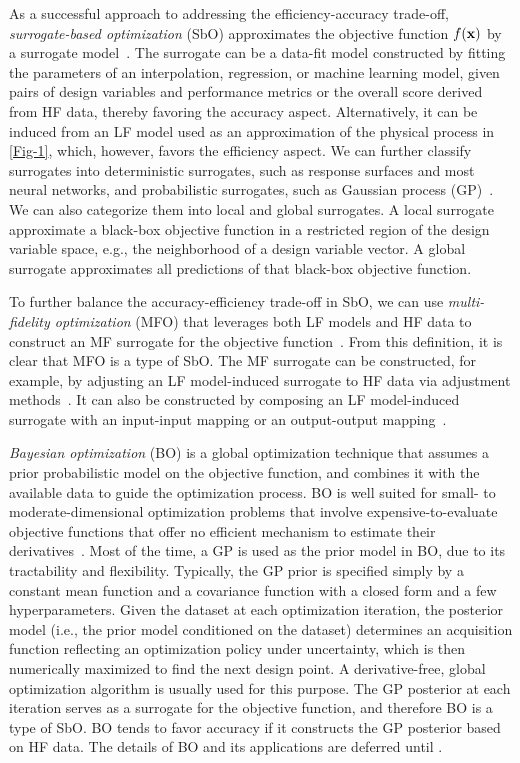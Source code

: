 \documentclass[journal ]{new-aiaa}
\begin{document}
	As a successful approach to addressing the efficiency-accuracy trade-off, \textit{surrogate-based optimization} (SbO) approximates the objective function $f(\bf x)$ by a surrogate model~\citep{Queipo2005,Wang2006,Forrester2008,Simpson2008,Forrester2009}.
	The surrogate can be a data-fit model constructed by fitting the parameters of an interpolation, regression, or machine learning model, given pairs of design variables and performance metrics or the overall score derived from HF data, thereby favoring the accuracy aspect.
	Alternatively, it can be induced from an LF model used as an approximation of the physical process in \cref{Fig-1}, which, however, favors the efficiency aspect.
	We can further classify surrogates into deterministic surrogates, such as response surfaces and most neural networks, and probabilistic surrogates, such as Gaussian process (GP)~\citep{Rasmussen2006}.
	We can also categorize them into local and global surrogates.
	A local surrogate approximate a black-box objective function in a restricted region of the design variable space, e.g., the neighborhood of a design variable vector.
	A global surrogate approximates all predictions of that black-box objective function.
	
	To further balance the accuracy-efficiency trade-off in SbO, we can use \textit{multi-fidelity optimization} (MFO) that leverages both LF models and HF data to construct an MF surrogate for the objective function~\citep{Alexandrov1998,Huang2006smo,Forrester2007,Viana2014}.
	From this definition, it is clear that MFO is a type of SbO.
	The MF surrogate can be constructed, for example, by adjusting an LF model-induced surrogate to HF data via adjustment methods~\citep{Kennedy2000,Han2012,Gratiet2014}.
	It can also be constructed by composing an LF model-induced surrogate with an input-input mapping or an output-output mapping~\citep{Bandler1994,Bandler2004,Perdikaris2017}.
	
	\textit{Bayesian optimization} (BO) is a global optimization technique that assumes a prior probabilistic model on the objective function, and combines it with the available data to guide the optimization process.
	BO is well suited for small- to moderate-dimensional optimization problems that involve expensive-to-evaluate objective functions that offer no efficient mechanism to estimate their derivatives~\citep{Snoek2012,Shahriari2016,Frazier2018}.
	Most of the time, a GP is used as the prior model in BO, due to its tractability and flexibility.
	Typically, the GP prior is specified simply by a constant mean function and a covariance function with a closed form and a few hyperparameters.
	Given the dataset at each optimization iteration, the posterior model (i.e., the prior model conditioned on the dataset) determines an acquisition function reflecting an optimization policy under uncertainty, which is then numerically maximized to find the next design point.
	A derivative-free, global optimization algorithm is usually used for this purpose.
	The GP posterior at each iteration serves as a surrogate for the objective function, and therefore BO is a type of SbO.
	BO tends to favor accuracy if it constructs the GP posterior based on HF data.
	The details of BO and its applications are deferred until .  
	
\end{document}
